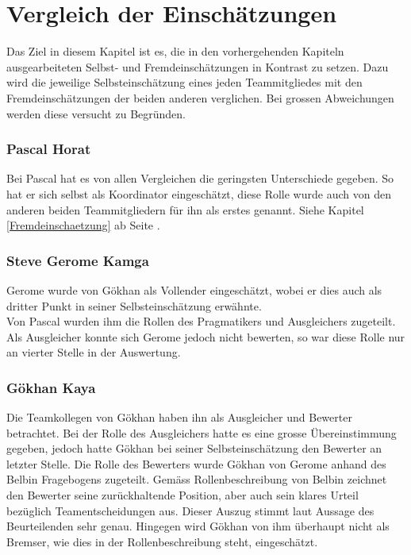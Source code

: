 
\chapter{Vergleich der Einschätzungen}
Das Ziel in diesem Kapitel ist es, die in den vorhergehenden Kapiteln ausgearbeiteten Selbst- und Fremdeinschätzungen in Kontrast zu setzen. Dazu wird die jeweilige Selbsteinschätzung eines jeden Teammitgliedes mit den Fremdeinschätzungen der beiden anderen verglichen. Bei grossen Abweichungen werden diese versucht zu Begründen.

\subsection*{Pascal Horat}
Bei Pascal hat es von allen Vergleichen die geringsten Unterschiede gegeben. So hat er sich selbst als Koordinator eingeschätzt, diese Rolle wurde auch von den anderen beiden Teammitgliedern für ihn als erstes genannt. Siehe Kapitel \ref{Fremdeinschaetzung} ab Seite \pageref{Fremdeinschaetzung}. 

\subsection*{Steve Gerome Kamga}
Gerome wurde von Gökhan als Vollender eingeschätzt, wobei er dies auch als dritter Punkt in seiner Selbsteinschätzung erwähnte. \\
Von Pascal wurden ihm die Rollen des Pragmatikers und Ausgleichers zugeteilt. Als Ausgleicher konnte sich Gerome jedoch nicht bewerten, so war diese Rolle nur an vierter Stelle in der Auswertung.

\subsection*{Gökhan Kaya}
Die Teamkollegen von Gökhan haben ihn als Ausgleicher und Bewerter betrachtet. Bei der Rolle des Ausgleichers hatte es eine grosse Übereinstimmung gegeben, jedoch hatte Gökhan bei seiner Selbsteinschätzung den Bewerter an letzter Stelle. Die Rolle des Bewerters wurde Gökhan von Gerome anhand des Belbin Fragebogens zugeteilt. Gemäss Rollenbeschreibung von Belbin zeichnet den Bewerter seine zurückhaltende Position, aber auch sein klares Urteil bezüglich Teamentscheidungen aus. Dieser Auszug stimmt laut Aussage des Beurteilenden sehr genau. Hingegen wird Gökhan von ihm überhaupt nicht als Bremser, wie dies in der Rollenbeschreibung steht, eingeschätzt.